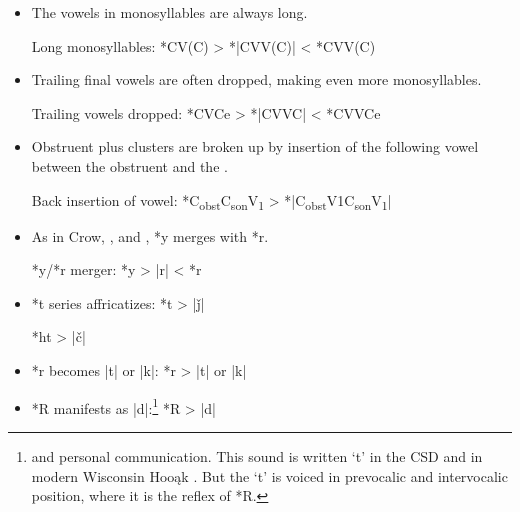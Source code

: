 \documentclass[output=paper]{LSP/langsci}
\begin{document}
\begin{itemize}
\item The vowels in monosyllables are always long.


Long monosyllables: \hspace{1em} *CV(C)    >	*|CVV(C)|     <	*CVV(C)
\item Trailing final vowels are often dropped, making even more monosyllables.


Trailing vowels dropped: \hspace{1em} 	*CVCe    >	*|CVVC|        <	*CVVCe
\item Obstruent plus  clusters are broken up by insertion of the following vowel between the obstruent and the .


Back insertion of vowel:	 \hspace{1em}  *C\textsubscript{obst}C\textsubscript{son}V\textsubscript{1}    >	*|C\textsubscript{obst}V1C\textsubscript{son}V\textsubscript{1}|
\item As in Crow, , and ,  *y merges with *r.


*y/*r merger: \hspace{1em} *y	>	|r|	<	*r
\item *t series affricatizes: \hspace{1em} *t  >  |\v{j}|  

\hspace{9.2em} *ht	 >  |\v{c}|  

\item *r\textsuperscript{} becomes |t\textsuperscript{}| or |k\textsuperscript{}|: \hspace{1em} *r\textsuperscript{}	>	|t\textsuperscript{}| or |k\textsuperscript{}|
\item *R manifests as |d|:\footnote{\citet{HelmbrechtND} and personal communication. This sound is written `t' in the CSD and in modern Wisconsin Hoo\k{a}k . But the `t' is voiced in prevocalic and intervocalic position, where it is the reflex of *R.} \hspace{2em} *R	>	|d|
\end{itemize}
\end{document}
